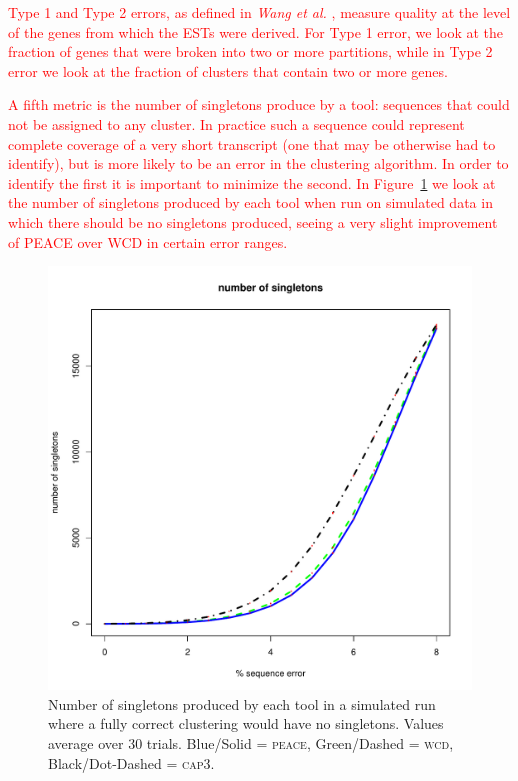 \documentclass[a4paper,12pt]{article}
\newcommand{\mc}[1]{\textcolor{red}{#1}}
\begin{document}
\begin{appendix}
\mc{Type 1 and Type 2 errors, as defined in {\it Wang et al.}
\cite{Wang04}, measure quality at the level of the genes from which
the ESTs were derived.  For Type 1 error, we look at the fraction of genes
that were broken into two or more partitions, while in
Type 2 error we look at the fraction of clusters that contain two or
more genes.}

\mc{A fifth metric is the number of singletons produce by a
  tool:  sequences that  could not  be  assigned to  any cluster.   In
  practice such a sequence could represent complete coverage of a very
  short transcript (one that may be otherwise had to identify), but is
  more likely to be an error in the clustering algorithm.  In order to
  identify  the first  it is  important  to minimize  the second.   In
  Figure~\ref{singletons} we look at the number of singletons produced
  by each tool when run on  simulated data in which there should be no
  singletons produced,  seeing a very slight improvement  of PEACE over
  WCD in certain error ranges.}

\begin{figure}[tbp]
\centerline{
\includegraphics[scale=0.35]{pics.d/singletons_40.pdf}
}
\caption{Number of singletons produced by each tool in a simulated run
  where a fully correct clustering would have no singletons.  Values
  average over 30 trials.  Blue/Solid = \textsc{peace}, Green/Dashed =
  \textsc{wcd}, Black/Dot-Dashed = \textsc{cap3}.}\label{singletons}
\end{figure}



\end{appendix}
\end{document}
